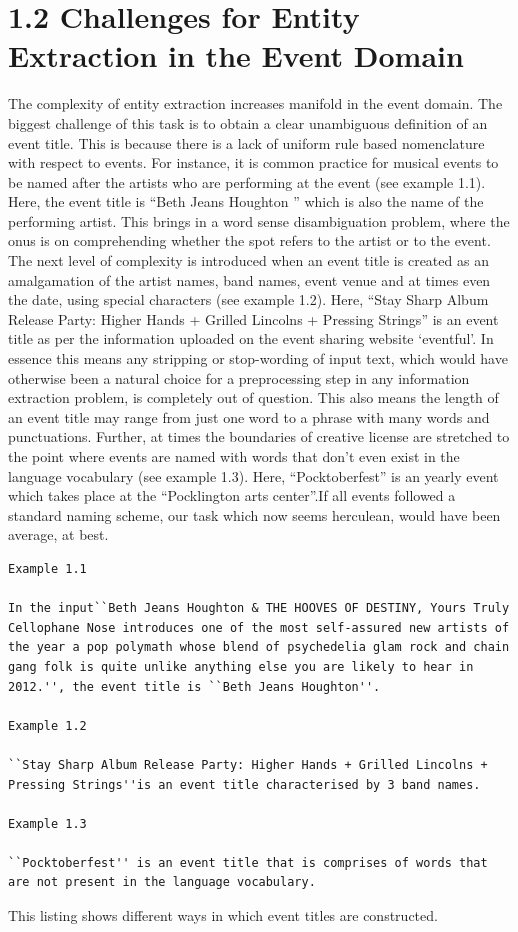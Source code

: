 \documentclass[a4paper,11pt]{report}
\begin{document}
\section*{1.2 Challenges for Entity Extraction in the Event Domain}

The complexity of entity extraction increases manifold in the event domain. The biggest challenge of this task is to obtain a clear unambiguous definition of an event title. This is because there is a lack of uniform rule based nomenclature with respect to events. For instance, it is common practice for musical events to be named after the artists who are performing at the event (see example 1.1). Here, the event title is ``Beth Jeans Houghton '' which is also the name of the performing artist. This brings in a word sense disambiguation problem, where the onus is on comprehending whether the spot refers to the artist or to the event. The next level of complexity is introduced when an event title is created as an amalgamation of the artist names, band names, event venue and at times even the date, using special characters (see example 1.2). Here, ``Stay Sharp Album Release Party: Higher Hands + Grilled Lincolns + Pressing Strings'' is an event title as per the information uploaded on the event sharing website `eventful'. In essence this means any stripping or stop-wording of input text, which would have otherwise been a natural choice for a preprocessing step in any information extraction problem, is completely out of question. This also means the length of an event title may range from just one word to a phrase with many words and punctuations. Further, at times the boundaries of creative license are stretched to the point where events are named with words that don't even exist in the language vocabulary (see example 1.3). Here, ``Pocktoberfest'' is an yearly event which takes place at the ``Pocklington arts center''.If all events followed a standard naming scheme, our task which now seems herculean, would have been average, at best.\newline 

\begin{lstlisting}
Example 1.1

In the input``Beth Jeans Houghton & THE HOOVES OF DESTINY, Yours Truly Cellophane Nose introduces one of the most self-assured new artists of the year a pop polymath whose blend of psychedelia glam rock and chain gang folk is quite unlike anything else you are likely to hear in 2012.'', the event title is ``Beth Jeans Houghton''.

Example 1.2

``Stay Sharp Album Release Party: Higher Hands + Grilled Lincolns + Pressing Strings''is an event title characterised by 3 band names.

Example 1.3

``Pocktoberfest'' is an event title that is comprises of words that are not present in the language vocabulary.
\end{lstlisting}
This listing shows different ways in which event titles are constructed. \newline \newline
\end{document}
